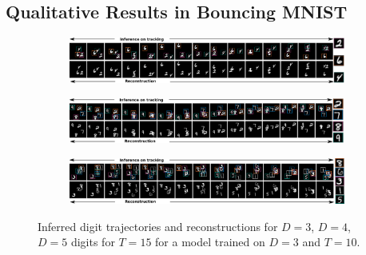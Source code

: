 \documentclass[anonymous=false, %
               format=acmsmall, %
               review=true, %
               screen=true, %
               nonacm=true]{acmart}
\theoremstyle{definition}
\begin{document}
\subsection{Qualitative Results in Bouncing MNIST}
\label{appendix:samples-bmnist}
\begin{figure}[!h]
  \centering
  \begin{subfigure}[t]{1.0\textwidth}
  \includegraphics[width=1.0\textwidth]{figures/bmnist-3digits-samples.pdf}
  \end{subfigure}
  \begin{subfigure}[t]{1.0\textwidth}
  \includegraphics[width=1.0\textwidth]{figures/bmnist-4digits-samples.pdf}
  \end{subfigure}
  \begin{subfigure}[t]{1.0\textwidth}
  \includegraphics[width=1.0\textwidth]{figures/bmnist-5digits-samples.pdf}
  \end{subfigure}
  \caption{Inferred digit trajectories and reconstructions for $D = 3$, $D = 4$, $D = 5$ digits for $T = 15$ for a model trained on $D = 3$ and $T = 10$.}
\end{figure}
\end{document}
